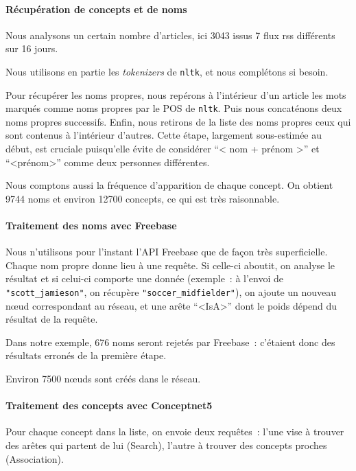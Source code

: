 \documentclass[a4paper, 12pt]{article}
\newcommand{\pyt}[1]{\texttt{#1}}%
\newcommand{\ang}[1]{\textit{#1}}%
\begin{document}
\paragraph{Récupération de concepts et de noms}

Nous analysons un certain nombre d'articles, ici 3043 issus 7 flux rss différents sur 16 jours.

Nous utilisons en partie les \ang{tokenizers} de \pyt{nltk}, et nous complétons si besoin.

Pour récupérer les noms propres, nous repérons à l'intérieur d'un article les mots marqués comme noms propres par le POS de \pyt{nltk}. Puis nous concaténons deux noms propres successifs. Enfin, nous retirons de la liste des noms propres ceux qui sont contenus à l'intérieur d'autres. Cette étape, largement sous-estimée au début, est cruciale puisqu'elle évite de considérer ``< nom + prénom >'' et ``<prénom>'' comme deux personnes différentes.

Nous comptons aussi la fréquence d'apparition de chaque concept. On obtient 9744 noms et environ 12700 concepts, ce qui est très raisonnable.

\paragraph{Traitement des noms avec Freebase}

Nous n'utilisons pour l'instant l'API Freebase que de fa\c{c}on très superficielle. Chaque nom propre donne lieu à une requête. Si celle-ci aboutit, on analyse le résultat et si celui-ci comporte une donnée (exemple~: à l'envoi de \verb|"scott_jamieson"|, on récupère \verb|"soccer_midfielder"|), on ajoute un nouveau nœud correspondant au réseau, et une arête ``<IsA>'' dont le poids dépend du résultat de la requête.

Dans notre exemple, 676 noms seront rejetés par Freebase~: c'étaient donc des résultats erronés de la première étape.

Environ 7500 nœuds sont créés dans le réseau.

\paragraph{Traitement des concepts avec Conceptnet5}

Pour chaque concept dans la liste, on envoie deux requêtes~: l'une vise à trouver des arêtes qui partent de lui (Search), l'autre à trouver des concepts proches (Association). 
\end{document}
